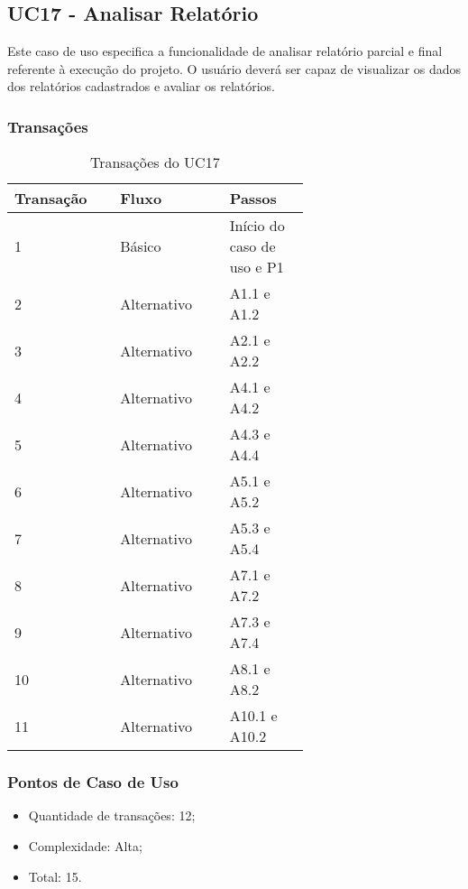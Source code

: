   \vfill

\pagebreak
\subsection{UC17 - Analisar Relatório}
  
  Este caso de uso especifica a funcionalidade de analisar relatório parcial e final referente à execução do projeto.
  O usuário deverá ser capaz de visualizar os dados dos relatórios cadastrados e avaliar os relatórios.
  
  \subsubsection{Transações}

  \begin{table*}[!h]
  \centering
  \caption{Transações do UC17}
  \label{uc17_transactions}
    \begin{tabular}{|p{0.20\linewidth}|p{0.25\linewidth}|p{0.20\linewidth}|}
    \hline
    \textbf{Transação} & \textbf{Fluxo} & \textbf{Passos} \\ 
    \hline
    1 & Básico & Início do caso de uso e P1\\
    \hline
    2 & Alternativo & A1.1 e A1.2\\
    \hline
    3 & Alternativo & A2.1 e A2.2\\
    \hline
    4 & Alternativo & A4.1 e A4.2\\
    \hline
    5 & Alternativo & A4.3 e A4.4\\
    \hline
    6 & Alternativo & A5.1 e A5.2\\
    \hline
    7 & Alternativo & A5.3 e A5.4\\
      \hline
    8 & Alternativo & A7.1 e A7.2\\
      \hline
    9 & Alternativo & A7.3 e A7.4\\
      \hline
    10 & Alternativo & A8.1 e A8.2\\
      \hline
    11 & Alternativo & A10.1 e A10.2\\
    \hline
    \end{tabular}
  \end{table*}

  \subsubsection{Pontos de Caso de Uso}

  \begin{itemize}
  \item Quantidade de transações: 12;
  \item Complexidade: Alta;
  \item Total: 15.
  \end{itemize}
  
